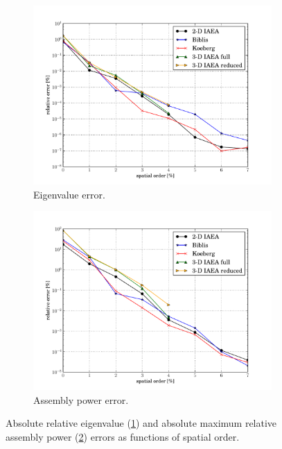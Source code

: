 \begin{figure}[htbp]
  \centering
  \begin{subfigure}{0.49\textwidth}
    \centering
    \includegraphics[keepaspectratio, width=1.0\textwidth]
                    {diffusion_order_study_eigenvalue}
    \caption{Eigenvalue error.}
    \label{fig:diffusion_order_study_eigenvalue}                   
  \end{subfigure}
  \begin{subfigure}{0.49\textwidth}
    \centering
    \includegraphics[keepaspectratio, width=1.0\textwidth]
                    {diffusion_order_study_power}
    \caption{Assembly power error.}
    \label{fig:diffusion_order_study_power}                 
  \end{subfigure}
  \caption{Absolute relative eigenvalue 
          (\ref{fig:diffusion_order_study_eigenvalue}) and 
          absolute maximum relative 
          assembly power
           (\ref{fig:diffusion_order_study_power})
          errors as functions of 
          spatial order.}
  \label{fig:diffusion_order_study}
\end{figure}



